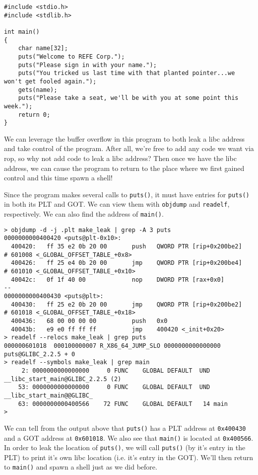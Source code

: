 \begin{lstlisting}
#include <stdio.h>
#include <stdlib.h>

int main()
{
	char name[32];
	puts("Welcome to REFE Corp.");
	puts("Please sign in with your name.");
	puts("You tricked us last time with that planted pointer...we won't get fooled again.");
	gets(name);
	puts("Please take a seat, we'll be with you at some point this week.");
	return 0;
}
\end{lstlisting}

We can leverage the buffer overflow in this program to both leak a libc address
and take control of the program. After all, we're free to add any code we want
via rop, so why not add code to leak a libc address? Then once we have the libc
address, we can cause the program to return to the place where we first gained
control and this time spawn a shell!

Since the program makes several calls to \texttt{puts()}, it must have entries
for \texttt{puts()} in both its PLT and GOT. We can view them with
\texttt{objdump} and \texttt{readelf}, respectively. We can also find the
address of \texttt{main()}.

\begin{lstlisting}
> objdump -d -j .plt make_leak | grep -A 3 puts
0000000000400420 <puts@plt-0x10>:
  400420:	ff 35 e2 0b 20 00    	push   QWORD PTR [rip+0x200be2]        # 601008 <_GLOBAL_OFFSET_TABLE_+0x8>
  400426:	ff 25 e4 0b 20 00    	jmp    QWORD PTR [rip+0x200be4]        # 601010 <_GLOBAL_OFFSET_TABLE_+0x10>
  40042c:	0f 1f 40 00          	nop    DWORD PTR [rax+0x0]
--
0000000000400430 <puts@plt>:
  400430:	ff 25 e2 0b 20 00    	jmp    QWORD PTR [rip+0x200be2]        # 601018 <_GLOBAL_OFFSET_TABLE_+0x18>
  400436:	68 00 00 00 00       	push   0x0
  40043b:	e9 e0 ff ff ff       	jmp    400420 <_init+0x20>
> readelf --relocs make_leak | grep puts
000000601018  000100000007 R_X86_64_JUMP_SLO 0000000000000000 puts@GLIBC_2.2.5 + 0
> readelf --symbols make_leak | grep main
     2: 0000000000000000     0 FUNC    GLOBAL DEFAULT  UND __libc_start_main@GLIBC_2.2.5 (2)
    53: 0000000000000000     0 FUNC    GLOBAL DEFAULT  UND __libc_start_main@@GLIBC_
    63: 0000000000400566    72 FUNC    GLOBAL DEFAULT   14 main
> 
\end{lstlisting}

We can tell from the output above that \texttt{puts()} has a PLT address at
\texttt{0x400430} and a GOT address at \texttt{0x601018}. We also see that
\texttt{main()} is located at \texttt{0x400566}. In order to leak the location
of \texttt{puts()}, we will call \texttt{puts()} (by it's entry in the PLT) to
print it's own libc location (i.e. it's entry in the GOT). We'll then return to
\texttt{main()} and spawn a shell just as we did before.

